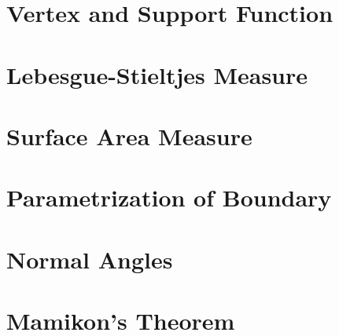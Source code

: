 
\section{Vertex and Support Function}
\label{sec:vertex-and-support-function}


\section{Lebesgue-Stieltjes Measure}
\label{sec:lebesgue-stieltjes-measure}


\section{Surface Area Measure}
\label{sec:surface-area-measure}


\section{Parametrization of Boundary}
\label{sec:parametrization-of-boundary}


\section{Normal Angles}
\label{sec:normal-angles}


\section{Mamikon's Theorem}
\label{sec:mamikon's-theorem}



